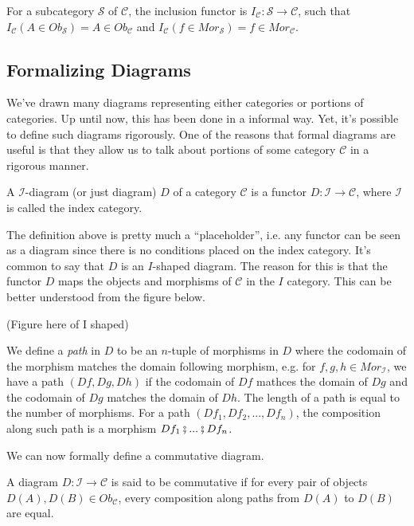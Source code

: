 \begin{example}
	For a subcategory $\mathcal S$ of $\mathcal C$, the inclusion
	functor is $I_\mathcal C : \mathcal S \to \mathcal C$, such that
	$I_\mathcal C (A \in Ob_\mathcal S) = A \in Ob_\mathcal C$ and
	$I_\mathcal C (f \in Mor_\mathcal S) = f \in Mor_\mathcal C$.
\end{example}

\subsection{Formalizing Diagrams}

We've drawn many diagrams representing either categories or portions of categories. Up
until now, this has been done in a informal way. Yet, it's possible to define such diagrams rigorously.
One of the reasons that formal diagrams are useful is that they allow us to talk about portions
of some category $\mathcal C$ in a rigorous manner.

\begin{definition}[Diagram]
	A $\mathcal I$-diagram (or just diagram) $D$ of a category $\mathcal C$ is a functor
	$D: \mathcal I \to \mathcal C$, where $\mathcal I$ is called the index category.
\end{definition}

The definition above is pretty much a ``placeholder'', i.e. any functor can be seen as
a diagram since there is no conditions placed on the index category. It's common to
say that $D$ is an $I$-shaped diagram. The reason for this is that the functor
$D$ maps the objects and morphisms of $\mathcal C$ in the $I$ category. This
can be better understood from the figure below.

(Figure here of I shaped)

We define a \textit{path} in $D$ to be an $n$-tuple of morphisms in $D$ where
the codomain of the morphism matches the domain following morphism, e.g.
for $f,g,h \in Mor_\mathcal I$, we have a path $(Df, Dg, Dh)$ if
the codomain of $Df$ mathces the domain of $Dg$ and the codomain of $Dg$ matches
the domain of $Dh$.
The length of a path is equal to the number of morphisms. For a path
$(Df_1, Df_2,...,Df_n)$, the composition along such path is a morphism $Df_1\fatsemi ...\fatsemi Df_n$.

We can now formally define a commutative diagram.

\begin{definition}
	A diagram $D:\mathcal I \to \mathcal C$ is said to be commutative if
	for every pair of objects $D(A), D(B) \in Ob_\mathcal C$,
	every composition along paths from $D(A)$ to $D(B)$ are equal.
\end{definition}

